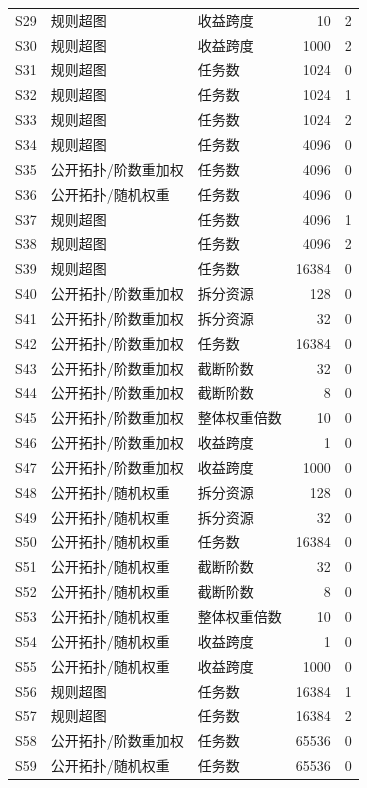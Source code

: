 {\begin{longtable}{lllrl}
S29 & 规则超图 & 收益跨度 & 10 & 2\\
S30 & 规则超图 & 收益跨度 & 1000 & 2\\
S31 & 规则超图 & 任务数 & 1024 & 0\\
S32 & 规则超图 & 任务数 & 1024 & 1\\
S33 & 规则超图 & 任务数 & 1024 & 2\\
S34 & 规则超图 & 任务数 & 4096 & 0\\
S35 & 公开拓扑/阶数重加权 & 任务数 & 4096 & 0\\
S36 & 公开拓扑/随机权重 & 任务数 & 4096 & 0\\
S37 & 规则超图 & 任务数 & 4096 & 1\\
S38 & 规则超图 & 任务数 & 4096 & 2\\
S39 & 规则超图 & 任务数 & 16384 & 0\\
S40 & 公开拓扑/阶数重加权 & 拆分资源 & 128 & 0\\
S41 & 公开拓扑/阶数重加权 & 拆分资源 & 32 & 0\\
S42 & 公开拓扑/阶数重加权 & 任务数 & 16384 & 0\\
S43 & 公开拓扑/阶数重加权 & 截断阶数 & 32 & 0\\
S44 & 公开拓扑/阶数重加权 & 截断阶数 & 8 & 0\\
S45 & 公开拓扑/阶数重加权 & 整体权重倍数 & 10 & 0\\
S46 & 公开拓扑/阶数重加权 & 收益跨度 & 1 & 0\\
S47 & 公开拓扑/阶数重加权 & 收益跨度 & 1000 & 0\\
S48 & 公开拓扑/随机权重 & 拆分资源 & 128 & 0\\
S49 & 公开拓扑/随机权重 & 拆分资源 & 32 & 0\\
S50 & 公开拓扑/随机权重 & 任务数 & 16384 & 0\\
S51 & 公开拓扑/随机权重 & 截断阶数 & 32 & 0\\
S52 & 公开拓扑/随机权重 & 截断阶数 & 8 & 0\\
S53 & 公开拓扑/随机权重 & 整体权重倍数 & 10 & 0\\
S54 & 公开拓扑/随机权重 & 收益跨度 & 1 & 0\\
S55 & 公开拓扑/随机权重 & 收益跨度 & 1000 & 0\\
S56 & 规则超图 & 任务数 & 16384 & 1\\
S57 & 规则超图 & 任务数 & 16384 & 2\\
S58 & 公开拓扑/阶数重加权 & 任务数 & 65536 & 0\\
S59 & 公开拓扑/随机权重 & 任务数 & 65536 & 0\\
\end{longtable}}
